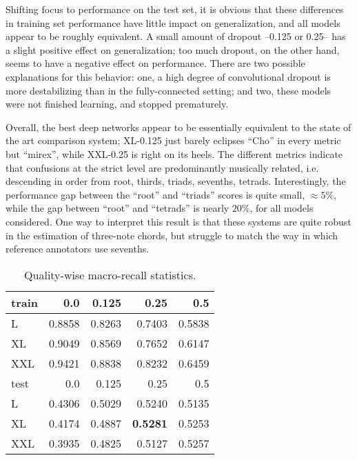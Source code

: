 Shifting focus to performance on the test set, it is obvious that these differences in training set performance have little impact on generalization, and all models appear to be roughly equivalent.
A small amount of dropout --0.125 or 0.25-- has a slight positive effect on generalization; too much dropout, on the other hand, seems to have a negative effect on performance.
There are two possible explanations for this behavior:
one, a high degree of convolutional dropout is more destabilizing than in the fully-connected setting;
and two, these models were not finished learning, and stopped prematurely.

Overall, the best deep networks appear to be essentially equivalent to the state of the art comparison system; XL-0.125 just barely eclipses ``Cho'' in every metric but ``mirex'', while XXL-0.25 is right on its heels.
The different metrics indicate that confusions at the strict level are predominantly musically related, i.e. descending in order from root, thirds, triads, sevenths, tetrads.
Interestingly, the performance gap between the ``root'' and ``triads'' scores is quite small, $\approx 5\%$, while the gap between ``root'' and ``tetrads'' is nearly $20\%$, for all models considered.
One way to interpret this result is that these systems are quite robust in the estimation of three-note chords, but struggle to match the way in which reference annotators use sevenths.


\begin{table}[t]
\begin{center}
\caption{Quality-wise macro-recall statistics.}
\label{tab:qwise_macro_recall}
\begin{tabular}{l|rrrr}
\hline
 train   &    0.0 &   0.125 &   0.25 &    0.5 \\
\hline
 L       & 0.8858 &  0.8263 & 0.7403 & 0.5838 \\
 XL      & 0.9049 &  0.8569 & 0.7652 & 0.6147 \\
 XXL     & 0.9421 &  0.8838 & 0.8232 & 0.6459 \\
\hline
 test   &    0.0 &   0.125 &   0.25 &    0.5 \\
\hline
 L      & 0.4306 &  0.5029 & 0.5240 & 0.5135 \\
 XL     & 0.4174 &  0.4887 & \textbf{0.5281} & 0.5253 \\
 XXL    & 0.3935 &  0.4825 & 0.5127 & 0.5257 \\
\hline
\end{tabular}
\end{center}
\end{table}

